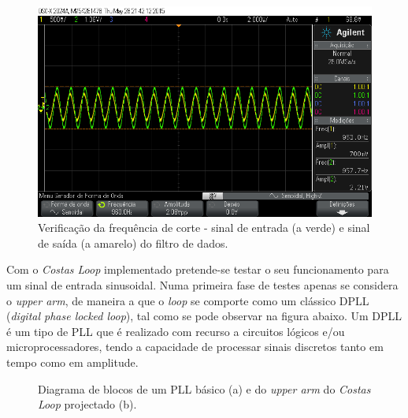 \documentclass[11pt]{article}
\numberwithin{equation}{section}
\begin{document}
{\begin{figure}[H]
	\centering
	\includegraphics[keepaspectratio=true, scale=0.37]{exps/filtro_1k_freqcorte}
	\caption{Verificação da frequência de corte - sinal de entrada (a verde) e sinal de saída (a amarelo) do filtro de dados.}
	\vspace{-0.8em}
\end{figure} 


Com o \textit{Costas Loop} implementado pretende-se testar o seu funcionamento para um sinal de entrada sinusoidal. Numa primeira fase de testes apenas se considera o \textit{upper arm}, de maneira a que o \textit{loop} se comporte como um clássico DPLL (\textit{digital phase locked loop}), tal como se pode observar na figura abaixo. Um DPLL é um tipo de PLL que é realizado com recurso a circuitos lógicos e/ou microprocessadores, tendo a capacidade de processar sinais discretos tanto em tempo como em amplitude.

\begin{figure}[H]
	\centering
	\hspace{8mm}
	\vspace{-0.8em}
	\caption{Diagrama de blocos de um PLL básico (a) e do \textit{upper arm} do \textit{Costas Loop} projectado (b).}
	\vspace{-0.8em}
\end{figure}

}
\end{document}
